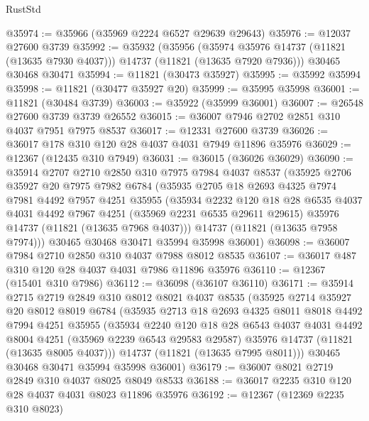 \begin{lexlean}{RustStd}
\begin{coremodule}
@35974 := @35966 (@35969 @2224 @6527 @29639 @29643)
@35976 := @12037 @27600 @3739
@35992 := @35932
    (@35956
      (@35974 @35976 @14737 (@11821 (@13635 @7930 @4037)))
      @14737
      (@11821 (@13635 @7920 @7936)))
    @30465
    @30468
    @30471
@35994 := @11821 (@30473 @35927)
@35995 := @35992 @35994
@35998 := @11821 (@30477 @35927 @20)
@35999 := @35995 @35998
@36001 := @11821 (@30484 @3739)
@36003 := @35922 (@35999 @36001)
@36007 := @26548 @27600 @3739 @3739 @26552
@36015 := @36007 @7946 @2702 @2851 @310 @4037 @7951 @7975 @8537
@36017 := @12331 @27600 @3739
@36026 := @36017 @178 @310 @120 @28 @4037 @4031 @7949 @11896 @35976
@36029 := @12367 (@12435 @310 @7949)
@36031 := @36015 (@36026 @36029)
@36090 := @35914
    @2707
    @2710
    @2850
    @310
    @7975
    @7984
    @4037
    @8537
    (@35925
      @2706
      @35927
      @20
      @7975
      @7982
      @6784
      (@35935
        @2705
        @18
        @2693
        @4325
        @7974
        @7981
        @4492
        @7957
        @4251
        @35955
        (@35934
          @2232
          @120
          @18
          @28
          @6535
          @4037
          @4031
          @4492
          @7967
          @4251
          (@35969 @2231 @6535 @29611 @29615)
          @35976
          @14737
          (@11821 (@13635 @7968 @4037)))
        @14737
        (@11821 (@13635 @7958 @7974)))
      @30465
      @30468
      @30471
      @35994
      @35998
      @36001)
@36098 := @36007 @7984 @2710 @2850 @310 @4037 @7988 @8012 @8535
@36107 := @36017 @487 @310 @120 @28 @4037 @4031 @7986 @11896 @35976
@36110 := @12367 (@15401 @310 @7986)
@36112 := @36098 (@36107 @36110)
@36171 := @35914
    @2715
    @2719
    @2849
    @310
    @8012
    @8021
    @4037
    @8535
    (@35925
      @2714
      @35927
      @20
      @8012
      @8019
      @6784
      (@35935
        @2713
        @18
        @2693
        @4325
        @8011
        @8018
        @4492
        @7994
        @4251
        @35955
        (@35934
          @2240
          @120
          @18
          @28
          @6543
          @4037
          @4031
          @4492
          @8004
          @4251
          (@35969 @2239 @6543 @29583 @29587)
          @35976
          @14737
          (@11821 (@13635 @8005 @4037)))
        @14737
        (@11821 (@13635 @7995 @8011)))
      @30465
      @30468
      @30471
      @35994
      @35998
      @36001)
@36179 := @36007 @8021 @2719 @2849 @310 @4037 @8025 @8049 @8533
@36188 := @36017 @2235 @310 @120 @28 @4037 @4031 @8023 @11896 @35976
@36192 := @12367 (@12369 @2235 @310 @8023)

\end{coremodule}
\end{lexlean}
